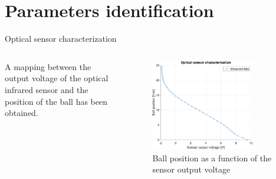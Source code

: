 \section{Parameters identification}

\begin{frame}{Optical sensor characterization}

    \begin{columns}[c, onlytextwidth]

        \begin{column}{0.40\textwidth}

            A mapping between the output voltage of the optical infrared sensor and the position of the ball has been obtained.

        \end{column}

        \begin{column}{0.6\textwidth}

            \begin{figure}[H]
                \centering
                \includegraphics[width=0.8\textwidth]{img/MATLAB/identification/sensor_position.pdf}
                \caption{Ball position as a function of the sensor output voltage}
            \end{figure}

        \end{column}

    \end{columns}

\end{frame}



